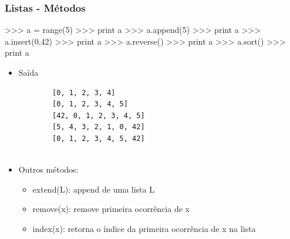 \documentclass[12pt,t,graphics]{beamer}
\newcommand{\ft}[1]{\frametitle{#1}}
\newcommand{\bi}{\begin{itemize}}
\newcommand{\ei}{\end{itemize}}
\begin{document}

\begin{frame}[fragile]
  \ft{Listas - Métodos }
  \begin{python}
    >>> a = range(5)
    >>> print a
    >>> a.append(5)
    >>> print a
    >>> a.insert(0,42)
    >>> print a
    >>> a.reverse()
    >>> print a
    >>> a.sort()
    >>> print a	
  \end{python}	
  \bi
\item Saída
  \begin{scriptsize}
\begin{verbatim}
		[0, 1, 2, 3, 4]
		[0, 1, 2, 3, 4, 5]
		[42, 0, 1, 2, 3, 4, 5]
		[5, 4, 3, 2, 1, 0, 42]
		[0, 1, 2, 3, 4, 5, 42]
		
\end{verbatim}
  \end{scriptsize}	
\item Outros métodos:
  \bi
\item extend(L): append de uma lista L
\item remove(x): remove primeira ocorrência de x
\item index(x): retorna o índice da primeira ocorrência de x na lista
  \ei
  \ei	
\end{frame}

\end{document}
